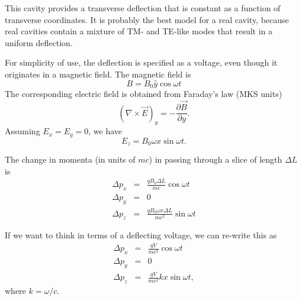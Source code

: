 This cavity provides a transverse deflection that is constant as
a function of transverse coordinates.  It is probably the best model
for a real cavity, because real cavities contain a mixture of TM- and
TE-like modes that result in a uniform deflection.

For simplicity of use, the deflection is specified as a voltage, even 
though it originates in a magnetic field.  The magnetic field is
\begin{equation}
B = B_0 \hat{y} \cos \omega t
\end{equation}
The corresponding electric field is obtained from Faraday's law (MKS units)
\begin{equation}
\left(\nabla \times \vec{E}\right)_y = - \frac{\partial \vec{B}}{\partial y}.
\end{equation}
Assuming $E_x = E_y = 0$, we have
\begin{equation}
E_z = B_0 \omega x \sin \omega t.
\end{equation}

The change in momenta (in units of $m c$) in passing through a slice of length $\Delta L$ is
\begin{eqnarray}
\Delta p_x & = & \frac{q B_0 \Delta L}{m c} \cos \omega t \\
\Delta p_y & = & 0 \\
\Delta p_z & = & \frac{q B_0 \omega x \Delta L}{m c^2} \sin\omega t 
\end{eqnarray}

If we want to think in terms of a deflecting voltage, we can re-write this as
\begin{eqnarray}
\Delta p_x & = & \frac{q V}{m c^2} \cos \omega t \\
\Delta p_y & = & 0 \\
\Delta p_z & = & \frac{q V}{m c^2} k x \sin\omega t,
\end{eqnarray}
where $k = \omega/c$.

